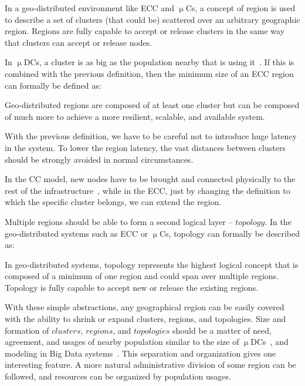 \begin{definition}
	In a geo-distributed environment like ECC and $\upmu$Cs, a concept of region is used to describe a set of clusters (that could be) scattered over an arbitrary geographic region. Regions are fully capable to accept or release clusters in the same way that clusters can accept or release nodes.
\end{definition}

\noindent
In $\upmu$DCs, a cluster is as big as the population nearby that is using it~\cite{GreenbergHMP09}. If this is combined with the previous definition, then the minimum size of an ECC region can formally be defined as:

\begin{definition}
	Geo-distributed regions are composed of at least one cluster but can be composed of much more to achieve a more resilient, scalable, and available system.
\end{definition}

\noindent
With the previous definition, we have to be careful not to introduce huge latency in the system. To lower the region latency, the vast distances between clusters should be strongly avoided in normal circumstances. 

In the CC model, new nodes have to be brought and connected physically to the rest of the infrastructure~\cite{Hamilton07}, while in the ECC, just by changing the definition to which the specific cluster belongs, we can extend the region.

Multiple regions should be able to form a second logical layer -- $topology$. In the geo-distributed systems such as ECC or $\upmu$Cs, topology can formally be described as:

\begin{definition}
In geo-distributed systems, topology represents the highest logical concept that is composed of a minimum of one region and could span over multiple regions. Topology is fully capable to accept new or release the existing regions. 
\end{definition}

\noindent
With these simple abstractions, any geographical region can be easily covered with the ability to shrink or expand clusters, regions, and topologies. Size and formation of $clusters$, $regions$, and $topologies$ should be a matter of need, agreement, and usages of nearby population similar to the size of $\upmu$DCs~\cite{GreenbergHMP09}, and modeling in Big Data systems~\cite{SonbolOAA20, WangCAL14}. This separation and organization gives one interesting feature. A more natural administrative division of some region can be followed, and resources can be organized by population usages.

